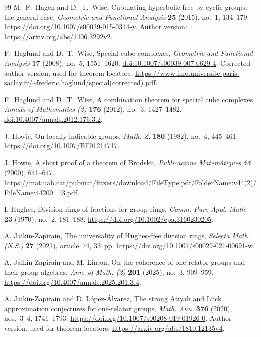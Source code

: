 \begin{thebibliography}{99}
M.~F.~Hagen and D.~T.~Wise,
Cubulating hyperbolic free-by-cyclic groups: the general case,
\emph{Geometric and Functional Analysis} \textbf{25} (2015), no.~1, 134--179.
\url{https://doi.org/10.1007/s00039-015-0314-y}.
Author version: \url{https://arxiv.org/abs/1406.3292v2}.

F.~Haglund and D.~T.~Wise,
Special cube complexes,
\emph{Geometric and Functional Analysis} \textbf{17} (2008), no.~5, 1551--1620.
\href{https://doi.org/10.1007/s00039-007-0629-4}{doi:10.1007/s00039-007-0629-4}.
Corrected author version, used for theorem locators:
\url{https://www.imo.universite-paris-saclay.fr/~frederic.haglund/special(corrected).pdf}.

F.~Haglund and D.~T.~Wise,
A combination theorem for special cube complexes,
\emph{Annals of Mathematics (2)} \textbf{176} (2012), no.~3, 1427--1482.
\href{https://doi.org/10.4007/annals.2012.176.3.2}{doi:10.4007/annals.2012.176.3.2}.

J. Howie,
On locally indicable groups,
\emph{Math. Z.} \textbf{180} (1982), no.~4, 445--461.
\url{https://doi.org/10.1007/BF01214717}.

J. Howie,
A short proof of a theorem of Brodskii,
\emph{Publicacions Matem\`atiques} \textbf{44} (2000), 641--647.
\url{https://mat.uab.cat/pubmat/fitxers/download/FileType:pdf/FolderName:v44(2)/FileName:44200_13.pdf}.

I. Hughes,
Division rings of fractions for group rings,
\emph{Comm. Pure Appl. Math.} \textbf{23} (1970), no.~2, 181--188.
\url{https://doi.org/10.1002/cpa.3160230205}.

A. Jaikin-Zapirain,
The universality of Hughes-free division rings,
\emph{Selecta Math. (N.S.)} \textbf{27} (2021), article~74, 33~pp.
\url{https://doi.org/10.1007/s00029-021-00691-w}.

A. Jaikin-Zapirain and M. Linton,
On the coherence of one-relator groups and their group algebras,
\emph{Ann. of Math. (2)} \textbf{201} (2025), no.~3, 909--959.
\url{https://doi.org/10.4007/annals.2025.201.3.4}.

A. Jaikin-Zapirain and D. L\'opez-\'Alvarez,
The strong Atiyah and L\"uck approximation conjectures for one-relator groups,
\emph{Math. Ann.} \textbf{376} (2020), nos.~3--4, 1741--1793.
\url{https://doi.org/10.1007/s00208-019-01926-0}.
Author version, used for theorem locators:
\url{https://arxiv.org/abs/1810.12135v4}.


\end{thebibliography}
